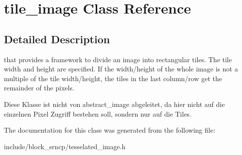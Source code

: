 \hypertarget{classtile__image}{\section{tile\-\_\-image Class Reference}
\label{classtile__image}
}


\subsection{Detailed Description}
that provides a framework to divide an image into rectangular tiles. The tile width and height are specified. If the width/height of the whole image is not a multiple of the tile width/height, the tiles in the last column/row get the remainder of the pixels.

Diese Klasse ist nicht von abstract\-\_\-image abgeleitet, da hier nicht auf die einzelnen Pixel Zugriff bestehen soll, sondern nur auf die Tiles. 

The documentation for this class was generated from the following file\-:\begin{DoxyCompactItemize}
\item 
include/block\-\_\-srncp/tesselated\-\_\-image.\-h\end{DoxyCompactItemize}
